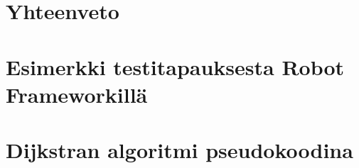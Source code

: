 \documentclass{config/tauthesis}
\theoremstyle{definition}
\begin{document}
\chapter{Yhteenveto} \label{ch:11_yhteenveto}
  
\printbibliography[heading=bibintoc]

\begin{appendices}
\chapter{Esimerkki testitapauksesta Robot Frameworkillä} \label{ch:12_liite_robot_testitapaus}
  
\chapter{Dijkstran algoritmi pseudokoodina} \label{ch:13_liite_dijkstran_algoritmi}
  
\end{appendices}
\end{document}
